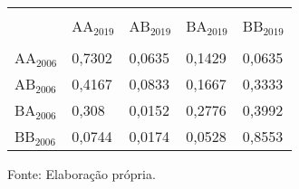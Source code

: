 \footnotesize
\vspace{0.05cm}
\label{transicao_regimes}
\begin{tabularx}{\textwidth}{XXXXX}
    \hline \\[-1.9ex]	 
    {}          & AA$_{2019}$ & AB$_{2019}$ & BA$_{2019}$ & BB$_{2019}$ \\
    \hline \\[-1.9ex]	 
    AA$_{2006}$ &  0,7302 &  0,0635 &  0,1429 &  0,0635 \\
    AB$_{2006}$ &  0,4167 &  0,0833 &  0,1667 &  0,3333 \\
    BA$_{2006}$ &   0,308 &  0,0152 &  0,2776 &  0,3992 \\
    BB$_{2006}$ &  0,0744 &  0,0174 &  0,0528 &  0,8553 \\	
    \hline 
\end{tabularx}
\footnotesize{Fonte: Elaboração própria.}
